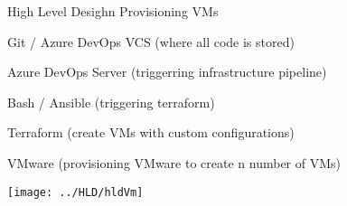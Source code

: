 \begin{frame}{High Level Desighn Provisioning VMs}
    \vspace*{.5cm}
    \begin{itemize}
         {
            \vfill \item<1-| alert@1> Git / Azure DevOps VCS (where all code is stored)
        }
         {
            \vfill \item<2-| alert@2> Azure DevOps Server (triggerring infrastructure pipeline)
        }
         {
            \vfill \item<3-| alert@3> Bash / Ansible (triggering terraform)
        }
         {
            \vfill \item<4-| alert@4> Terraform (create VMs with custom configurations)
        }
         {
            \vfill \item<5-| alert@5> VMware (provisioning VMware to create n number of VMs)
        }
    \end{itemize}
    \vspace*{-.65cm}
    \begin{center}
        \item[] \texttt{[image: ../HLD/hldVm]}
    \end{center}
\end{frame}